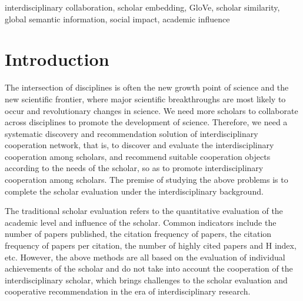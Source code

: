 \documentclass[conference]{IEEEtran}
\begin{document}
\begin{IEEEkeywords}
interdisciplinary collaboration, scholar embedding, GloVe, scholar similarity, global semantic information, social impact, academic influence
\end{IEEEkeywords}


%
\IEEEpeerreviewmaketitle



\section{Introduction}
The intersection of disciplines is often the new growth point of science
and the new scientific frontier, where major scientific breakthroughs
are most likely to occur and revolutionary changes in science. We need
more scholars to collaborate across disciplines to promote the development
of science. Therefore, we need a systematic discovery and recommendation
solution of interdisciplinary cooperation network, that is, to discover
and evaluate the interdisciplinary cooperation among scholars, and
recommend suitable cooperation objects according to the needs of the scholar,
so as to promote interdisciplinary cooperation among scholars. 
The premise of studying the above problems is to complete the scholar
evaluation under the interdisciplinary background.

The traditional scholar evaluation refers to the quantitative evaluation
of the academic level and influence of the scholar. Common indicators include
the number of papers published, the citation frequency of papers, the
citation frequency of papers per citation, the number of highly cited
papers and H index, etc. However, the above methods are all based on the
evaluation of individual achievements of the scholar and do not take into
account the cooperation of the interdisciplinary scholar, which brings
challenges to the scholar evaluation and cooperative recommendation in
the era of interdisciplinary research.
\end{document}
